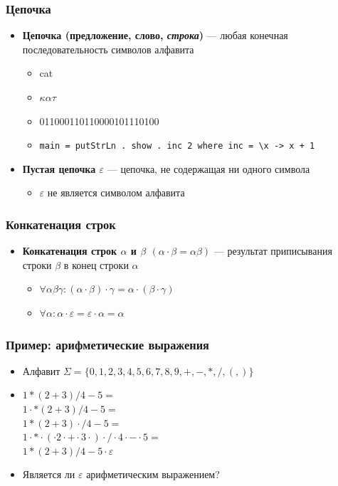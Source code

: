 \documentclass{beamer}
\begin{document}
\begin{frame}[fragile]
  \transwipe[direction=90]
  \frametitle{Цепочка}
  \begin{itemize}
    \item \textbf{Цепочка (предложение, слово, \emph{строка})} --- любая конечная 
последовательность символов алфавита
    \begin{itemize}
      \item cat
      \item $\kappa \alpha \tau$
      \item 011000110110000101110100
      \item \verb!main = putStrLn . show . inc 2 where inc = \x -> x + 1!
    \end{itemize}    
    \item \textbf{Пустая цепочка $\varepsilon$} --- цепочка, не содержащая ни одного символа
    \begin{itemize}
      \item $\varepsilon$ не является символом алфавита
    \end{itemize}   
  \end{itemize}
\end{frame}

\begin{frame}[fragile]
  \transwipe[direction=90]
  \frametitle{Конкатенация строк}
  \begin{itemize}
    \item \textbf{Конкатенация строк $\alpha$ и $\beta$ $(\alpha \cdot \beta = \alpha \beta)$} --- результат 
приписывания строки $\beta$ в конец строки $\alpha$
    \begin{itemize}
      \item $\forall \alpha \beta \gamma : (\alpha \cdot \beta) \cdot \gamma = \alpha \cdot (\beta \cdot \gamma)$
      \item $\forall \alpha : \alpha \cdot \varepsilon = \varepsilon \cdot \alpha = \alpha$
    \end{itemize}
  \end{itemize}
\end{frame}

\begin{frame}[fragile]
  \transwipe[direction=90]
  \frametitle{Пример: арифметические выражения}
  \begin{itemize}
    \item Алфавит $\Sigma = \{ 0, 1, 2, 3, 4, 5, 6, 7, 8, 9, +, -, *, /, (, ) \}$
    \item $1 * (2 + 3) / 4 - 5 =$ \\ $ 1 \cdot * (2 + 3) / 4 - 5 =$ \\ $ 1 * (2 + 3) \cdot / 4 - 5 = $\\ $ 1 \cdot * \cdot (\cdot 2 \cdot + \cdot 3 \cdot) \cdot / \cdot 4 \cdot - \cdot 5 = $ \\ $ 1 * (2 + 3) / 4 - 5 \cdot \varepsilon$
    \item Является ли $\varepsilon$ арифметическим выражением?
  \end{itemize}
\end{frame}
\end{document}
